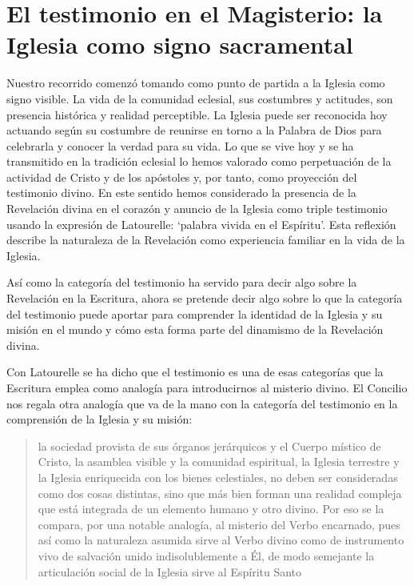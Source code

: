 \section{El testimonio en el Magisterio: la Iglesia como signo sacramental}

Nuestro recorrido comenzó tomando como punto de partida a la Iglesia como signo visible. La vida de la comunidad eclesial, sus costumbres y actitudes, son presencia histórica y realidad perceptible. La Iglesia puede ser reconocida hoy actuando según su costumbre de reunirse en torno a la Palabra de Dios para celebrarla y conocer la verdad para su vida. Lo que se vive hoy y se ha transmitido en la tradición eclesial lo hemos valorado como perpetuación de la actividad de Cristo y de los apóstoles y, por tanto, como proyección del testimonio divino. En este sentido hemos considerado la presencia de la Revelación divina en el corazón y anuncio de la Iglesia como triple testimonio usando la expresión de Latourelle: \enquote*{palabra vivida en el Espíritu}. Esta reflexión describe la naturaleza de la Revelación como experiencia familiar en la vida de la Iglesia.

Así como la categoría del testimonio ha servido para decir algo sobre la Revelación en la Escritura, ahora se pretende decir algo sobre lo que la categoría del testimonio puede aportar para comprender la identidad de la Iglesia y su misión en el mundo y cómo esta forma parte del dinamismo de la Revelación divina.

Con Latourelle se ha dicho que el testimonio es una de esas categorías que la Escritura emplea como analogía para introducirnos al misterio divino. El Concilio nos regala otra analogía que va de la mano con la categoría del testimonio en la comprensión de la Iglesia y su misión: \blockquote[][\,(LG 8)]{la sociedad provista de sus órganos jerárquicos y el Cuerpo místico de Cristo, la asamblea visible y la comunidad espiritual, la Iglesia terrestre y la Iglesia enriquecida con los bienes celestiales, no deben ser consideradas como dos cosas distintas, sino que más bien forman una realidad compleja que está integrada de un elemento humano y otro divino. Por eso se la compara, por una notable analogía, al misterio del Verbo encarnado, pues así como la naturaleza asumida sirve al Verbo divino como de instrumento vivo de salvación unido indisolublemente a Él, de modo semejante la articulación social de la Iglesia sirve al Espíritu Santo}.

